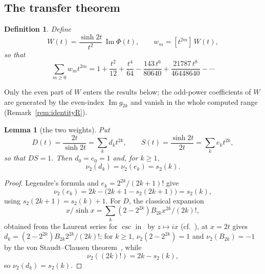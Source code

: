 \documentclass[10pt,a4paper]{amsart}
\newtheorem{lemma}[theorem]{Lemma}
\newtheorem{definitionx}[theorem]{Definition}
\begin{document}
\subsection{The transfer theorem}

\begin{definitionx}\label{def:W}
Define
\begin{equation}\label{eq:normalform}
  W(t)=\frac{\sinh2t}{t^2}\,\operatorname{Im}\Phi(t),
  \qquad
  w_m=[t^{2m}]\,W(t),
\end{equation}
so that
\[
  \sum_{m\ge0}w_mt^{2m}
  =1+\frac{t^2}{12}+\frac{t^4}{64}-\frac{143\,t^6}{80640}       +\frac{21787\,t^8}{46448640}-\cdots
\]
\end{definitionx}

Only the even part of $W$ enters the results below; the odd-power coefficients of $W$ are generated by the even-index $\operatorname{Im}g_{2k}$ and vanish in the whole computed range (Remark~\ref{rem:identityR}).

\begin{lemma}[the two weights]\label{lem:weights}
Put
\[
D(t)=\frac{2t}{\sinh2t}=\sum_kd_kt^{2k},\qquad S(t)=\frac{\sinh2t}{2t}=\sum_ke_kt^{2k},
\]
so that $DS=1$.  Then $d_0=e_0=1$ and, for $k\ge1$,
\[
  \nu_2(d_k)=\nu_2(e_k)=s_2(k).
\]
\end{lemma}

\begin{proof}
Legendre's formula and $e_k=2^{2k}/(2k+1)!$  give 
\[
\nu_2(e_k)=2k-\bigl(2k+1-s_2(2k+1)\bigr)=s_2(k), 
\]
using $s_2(2k+1)=s_2(k)+1$.  For $D$, the classical expansion 
\[
x/\sinh x=\sum_k(2-2^{2k})B_{2k}x^{2k}/(2k)!, 
\]
obtained from the Laurent series for $\csc$ in~\cite[Eq.~4.19.4]{DLMF} by $z\mapsto ix$ (cf.~\cite[Eqs.~4.28.8--4.28.13 and 24.2.1]{DLMF}), at $x=2t$ gives $d_k=(2-2^{2k})B_{2k}2^{2k}/(2k)!$; for $k\ge1$, $\nu_2(2-2^{2k})=1$ and $\nu_2(B_{2k})=-1$ by the von Staudt--Clausen theorem~\cite{Clausen,Rado,Carlitz}, while 
\[
\nu_2((2k)!)=2k-s_2(k), 
\]
so $\nu_2(d_k)=s_2(k)$.
\end{proof}
\end{document}
